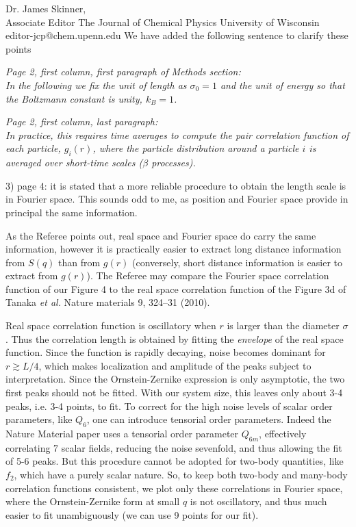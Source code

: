 \documentclass[a4paper, rebuttal, parskip=true, firsthead=false, fromemail=false, foldmarks=false]{scrlttr2}
\begin{document}
\begin{letter}{Dr. James Skinner,\\Associate Editor
The Journal of Chemical Physics
University of Wisconsin\\
editor-jcp@chem.upenn.edu }
We have added the following sentence to clarify these points

{\it Page 2, first column, first paragraph of Methods section:\\
In the following we fix the unit of length as $\sigma_0=1$ and the unit
of energy so that the Boltzmann constant is unity, $k_B=1$.
}

{\it Page 2, first column, last paragraph:\\
In practice, this requires time averages to compute the pair correlation function of each particle, $g_i(r)$,
where the particle distribution around a particle $i$ is averaged over short-time scales ($\beta$ processes).
}

\begin{quotationi}
3) page 4: it is stated that a more reliable procedure to obtain the
length scale is in Fourier space. This sounds odd to me, as position and
Fourier space provide in principal the same information.
\end{quotationi}

As the Referee points out, real space and Fourier space do carry the same information, however it is practically easier to extract long distance information from $S(q)$ than from $g(r)$ (conversely, short distance information is easier to extract from $g(r)$). The Referee may compare the Fourier space correlation function of our Figure 4 to the real space correlation function of the Figure 3d of Tanaka \emph{et al.} Nature materials 9, 324–31 (2010).

Real space correlation function is oscillatory when $r$ is larger than the diameter $\sigma$. Thus the correlation length is obtained by fitting the \emph{envelope} of the real space function. Since the function is rapidly decaying, noise becomes dominant for $r\gtrsim L/4$, which makes localization and amplitude of the peaks subject to interpretation. Since the Ornstein-Zernike expression is only asymptotic, the two first peaks should not be fitted. With our system size, this leaves only about 3-4 peaks, i.e. 3-4 points, to fit. To correct for the high noise levels of scalar order parameters, like $Q_6$, one can introduce tensorial order parameters. Indeed the Nature Material paper uses a tensorial order parameter $Q_{6m}$, effectively correlating 7 scalar fields, reducing the noise sevenfold, and thus allowing the fit of 5-6 peaks. But this procedure cannot be adopted for two-body quantities, like $f_2$, which have a purely scalar nature. So, to keep both two-body and many-body
correlation functions consistent, we plot only these correlations in Fourier space, where
the Ornstein-Zernike form at small $q$ is not oscillatory, and thus much easier to fit unambiguously (we can use 9 points for our fit).


\end{letter}
\end{document}
